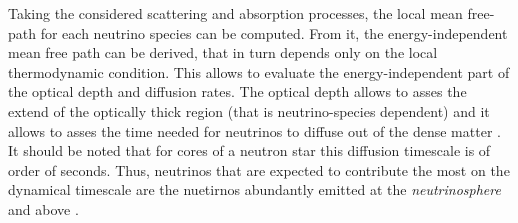 Taking the considered scattering and absorption processes, the local mean free-path for each neutrino species can be
computed. From it, the energy-independent mean free path can be derived, that in turn depends only on the local
thermodynamic condition. This allows to evaluate the energy-independent part of the optical depth and diffusion rates.
%
The optical depth allows to asses the extend of the optically thick region (that is neutrino-species dependent) 
and it allows to asses the time needed for neutrinos to diffuse out of the dense matter . 
It should be noted that for cores of a neutron star this diffusion timescale is of order of seconds. 
Thus, neutrinos that are expected to contribute the most on the dynamical timescale are the nuetirnos abundantly
emitted at the \textit{neutrinosphere} and above \citep{Galeazzi:2013mia,Endrizzi:2018uwl}.
%

%


